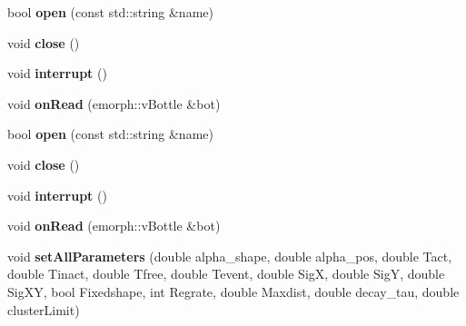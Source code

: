 \begin{DoxyCompactItemize}
\item 
bool {\bfseries open} (const std\+::string \&name)\hypertarget{classEventBottleManager_a41ce7bd0a716ab0a88c1ad505b02d20b}{}\label{classEventBottleManager_a41ce7bd0a716ab0a88c1ad505b02d20b}

\item 
void {\bfseries close} ()\hypertarget{classEventBottleManager_aa155dc6f20728e9f7ff13abf720ea6b8}{}\label{classEventBottleManager_aa155dc6f20728e9f7ff13abf720ea6b8}

\item 
void {\bfseries interrupt} ()\hypertarget{classEventBottleManager_a15152f9daa40714334c2da3871f959a9}{}\label{classEventBottleManager_a15152f9daa40714334c2da3871f959a9}

\item 
void {\bfseries on\+Read} (emorph\+::v\+Bottle \&bot)\hypertarget{classEventBottleManager_a9571d64d4640ef5a38f03a286d27425e}{}\label{classEventBottleManager_a9571d64d4640ef5a38f03a286d27425e}

\item 
bool {\bfseries open} (const std\+::string \&name)\hypertarget{classEventBottleManager_a41ce7bd0a716ab0a88c1ad505b02d20b}{}\label{classEventBottleManager_a41ce7bd0a716ab0a88c1ad505b02d20b}

\item 
void {\bfseries close} ()\hypertarget{classEventBottleManager_aa155dc6f20728e9f7ff13abf720ea6b8}{}\label{classEventBottleManager_aa155dc6f20728e9f7ff13abf720ea6b8}

\item 
void {\bfseries interrupt} ()\hypertarget{classEventBottleManager_a15152f9daa40714334c2da3871f959a9}{}\label{classEventBottleManager_a15152f9daa40714334c2da3871f959a9}

\item 
void {\bfseries on\+Read} (emorph\+::v\+Bottle \&bot)\hypertarget{classEventBottleManager_a9571d64d4640ef5a38f03a286d27425e}{}\label{classEventBottleManager_a9571d64d4640ef5a38f03a286d27425e}

\item 
void {\bfseries set\+All\+Parameters} (double alpha\+\_\+shape, double alpha\+\_\+pos, double Tact, double Tinact, double Tfree, double Tevent, double SigX, double SigY, double Sig\+XY, bool Fixedshape, int Regrate, double Maxdist, double decay\+\_\+tau, double cluster\+Limit)\hypertarget{classEventBottleManager_a451485cebdadbbad730d176894d9f0b1}{}\label{classEventBottleManager_a451485cebdadbbad730d176894d9f0b1}


\end{DoxyCompactItemize}
